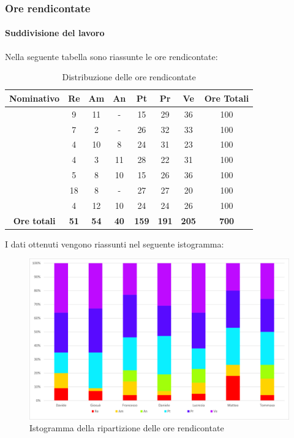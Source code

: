 \subsubsection{Ore rendicontate}
\paragraph{Suddivisione del lavoro}
Nella seguente tabella sono riassunte le ore rendicontate:
\begin{table}[H]
		\begin{center}
			\setlength{\aboverulesep}{0pt}
			\setlength{\belowrulesep}{0pt}
			\setlength{\extrarowheight}{.75ex}
			\begin{tabular}{ c c c c c c c c }
				\rowcolor{AzzurroGruppo!30} 
				\textbf{Nominativo} & \textbf{Re} & \textbf{Am} & \textbf{An} & \textbf{Pt} & \textbf{Pr} & \textbf{Ve} & \textbf{Ore Totali}  \\
				\toprule
				\Davide    & 9  & 11 & -  & 15  & 29 & 36 & 100 \\
				\Giosue    & 7  & 2 & -  & 26 & 32 & 33  & 100 \\
				\Francesco & 4  & 10 & 8  & 24 & 31 & 23  & 100\\
				\Daniele   & 4  & 3 & 11 & 28 & 22 & 31  & 100\\
				\Lucrezia  & 5  & 8 & 10 & 15  & 26 & 36 & 100\\
				\Matteo    & 18 & 8 & -  & 27 & 27 & 20  & 100\\
				\Tommaso   & 4  & 12 & 10 & 24  & 24 & 26  & 100\\
				 \textbf{Ore totali} & \textbf{51} & \textbf{54} & \textbf{40} & \textbf{159} & \textbf{191} & \textbf{205} & \textbf{700} \\
				\bottomrule
			\end{tabular}
			\caption{Distribuzione delle ore rendicontate}
		\end{center}
	\end{table}
	I dati ottenuti vengono riassunti nel seguente istogramma:
\begin{figure}[H]
    \centering
    \includegraphics[scale = 0.5]{components/img/Totale-rendicontate-isto.png}
    \caption{ Istogramma della ripartizione delle ore rendicontate}
    \label{fig:Istogramma ripartizione ore totali rendicontate}
\end{figure}
